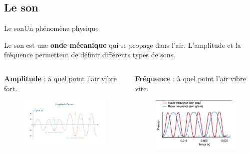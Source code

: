 \documentclass{beamer}
\begin{document}

\subsection{Le son}

\begin{frame}{Le son}{Un phénomène physique}
	\begin{definition}
		Le son est une \textbf{onde mécanique} qui se propage dans l'air. L'amplitude et la fréquence permettent de définir différents types de sons.
	\end{definition}
	\begin{columns}
		\begin{column}{0.5\textwidth}
			\textbf{Amplitude} : à quel point l'air vibre fort.
			\begin{figure}
				\includegraphics[width=1\linewidth]{amplitude-son.png}
			\end{figure}
		\end{column}
		\begin{column}{0.5\textwidth}
			\textbf{Fréquence} : à quel point l'air vibre vite.
			\begin{figure}
				\includegraphics[width=0.85\linewidth]{frequence-son.png}
			\end{figure}
		\end{column}
	\end{columns}
\end{frame}
\end{document}

